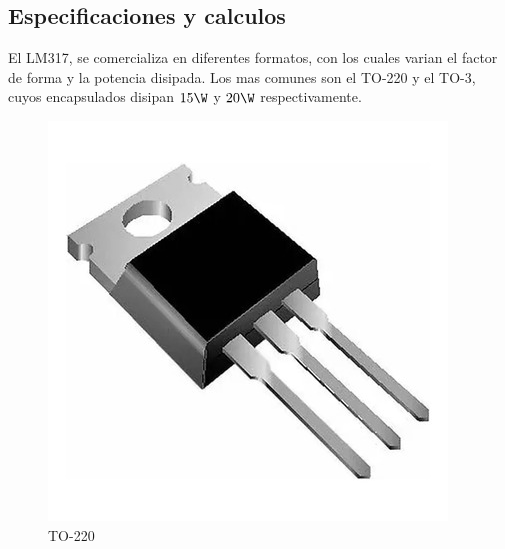 \documentclass[chaptersright]{informeutn}
\begin{document}
        \subsection{Especificaciones y calculos}
          El LM317, se comercializa en diferentes formatos, con los cuales varian el factor de forma y la potencia
          disipada. Los mas comunes son el TO-220 y el TO-3, cuyos encapsulados disipan $15\W$ y $20\W$ respectivamente.
          \begin{figure}[H]
            \centering
            \begin{minipage}[b]{0.3\textwidth}
                \centering
                \includegraphics[width=\textwidth]{pictures/to220.jpg}
                \caption*{TO-220}
            \end{minipage}
            \hspace{1cm}
            \begin{minipage}[b]{0.3\textwidth}
                \centering

\end{minipage}
\end{figure}
\end{document}
